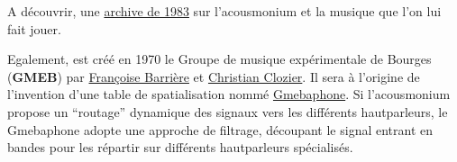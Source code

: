 \documentclass[
  letterpaper,
  DIV=11,
  numbers=noendperiod]{scrreprt}
\begin{document}
\begin{tcolorbox}[enhanced jigsaw, leftrule=.75mm, arc=.35mm, bottomtitle=1mm, colback=white, colbacktitle=quarto-callout-tip-color!10!white, opacityback=0, left=2mm, rightrule=.15mm, opacitybacktitle=0.6, breakable, toptitle=1mm, titlerule=0mm, bottomrule=.15mm, toprule=.15mm, coltitle=black, title=\textcolor{quarto-callout-tip-color}{\faLightbulb}\hspace{0.5em}{Astuce}]

A découvrir, une
\href{https://www.ina.fr/ina-eclaire-actu/audio/phd98021693/ecouter-grm-2eme-partie-l-acousmonium}{archive
de 1983} sur l'acousmonium et la musique que l'on lui fait jouer.

\end{tcolorbox}

Egalement, est créé en 1970 le Groupe de musique expérimentale de
Bourges (\textbf{GMEB}) par
\href{https://fr.wikipedia.org/wiki/Fran\%C3\%A7oise_Barri\%C3\%A8re}{Françoise
Barrière} et
\href{https://fr.wikipedia.org/wiki/Christian_Clozier}{Christian
Clozier}. Il sera à l'origine de l'invention d'une table de
spatialisation nommé
\href{https://misame.org/wp-content/uploads/1670/18/9-Concept-du-Gmebaphone-p126.pdf}{Gmebaphone}.
Si l'acousmonium propose un ``routage'' dynamique des signaux vers les
différents hautparleurs, le Gmebaphone adopte une approche de filtrage,
découpant le signal entrant en bandes pour les répartir sur différents
hautparleurs spécialisés.
\end{document}

